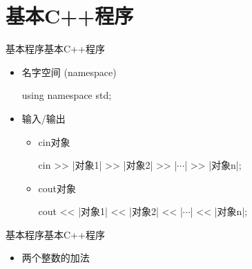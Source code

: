 \section[基本程序]{基本C++程序}\label{sec:chap01-sec07}
\begin{frame}[fragile]{基本程序}{基本C++程序}
  \vspace{-2ex}
  \begin{center}
    \begin{minipage}{0.8\linewidth}
    \end{minipage}
  \end{center}
  \vspace{-4ex}
  \begin{itemize}
  \item 名字空间 (namespace)\\
    \begin{minipage}{0.8\linewidth}
      \begin{cppcode}
using namespace std;
      \end{cppcode}
    \end{minipage}
  \item 输入/输出
    \begin{itemize}
    \item cin对象\\
      \begin{minipage}{0.8\linewidth}
      \begin{cpptt}
cin >> |对象1| >> |对象2| >> |$\cdots$| >> |对象n|;
      \end{cpptt}
    \end{minipage}
  \item cout对象\\
    \begin{minipage}{0.8\linewidth}
      \begin{cpptt}
cout << |对象1| << |对象2| << |$\cdots$| << |对象n|;
      \end{cpptt}
    \end{minipage}
    \end{itemize}
  \end{itemize}
\end{frame}

\begin{frame}[fragile]{基本程序}{基本C++程序}%
  \begin{itemize}
  \item 两个整数的加法       
  \end{itemize}
  \begin{center}
  \end{center}
\end{frame}

